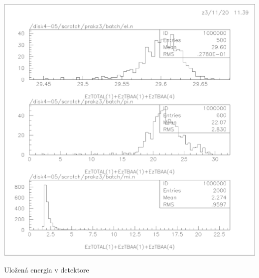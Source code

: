 \documentclass[a4paper, 10pt]{article}
\begin{document}
\begin{graph}[t]
\centering
\vspace*{-15pt}
\includegraphics[scale=0.8]{data/pulmann_batch_crop.eps}
\caption{ Uložená energia v detektore \label{graph:batch}}
\end{graph}
\end{document}
